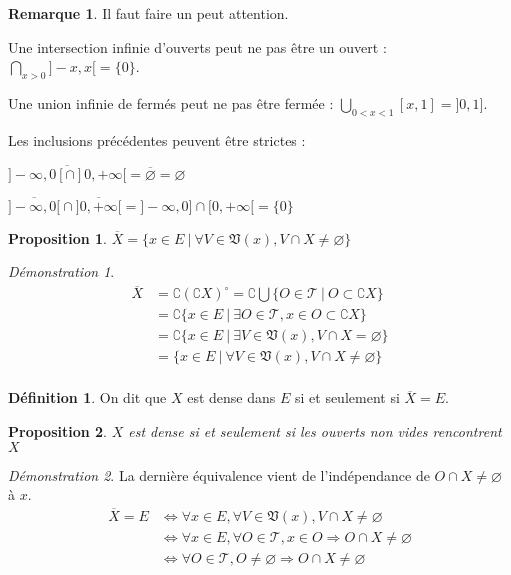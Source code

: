 \documentclass[a4paper, 11pt, french]{book}
\newenvironment{itemise}{\itemize}{\enditemize}
\theoremstyle{plain} %
\newtheorem{proposition}{Proposition}
\theoremstyle{definition} %
\newtheorem{definition}{Définition}
\newtheorem{remarque}{Remarque}
\theoremstyle{remark} %
\newtheorem*{demonstration}{Démonstration}
\newcommand{\1}{\mathds{1}}
\newcommand\vide{\varnothing}
\renewcommand{\frak}[1]{\mathfrak{#1}}
\newcommand{\scr}[1]{\mathscr{#1}}
\newcommand\ens[2]{\{#1 \ |\ #2\}}
\begin{document}
\begin{remarque}
	Il faut faire un peut attention.
	\begin{itemise}
		\item Une intersection infinie d'ouverts peut ne pas être un ouvert : $\bigcap_{x>0}]-x,x[=\{0\}$.
		\item Une union infinie de fermés peut ne pas être fermée : $\bigcup_{0<x<1}[x,1]=]0, 1]$.
		\item Les inclusions précédentes peuvent être strictes :
		\begin{itemise}
			\item $\overline{]-\infty, 0[\cap]0, +\infty[}=\overline{\vide}=\vide$
			\item $\overline{]-\infty, 0[}\cap\overline{]0, +\infty[}=]-\infty, 0]\cap[0, +\infty[=\{0\}$
		\end{itemise}
	\end{itemise}
\end{remarque}

\begin{proposition}
	$\overline{X}=\ens{x\in E}{\forall V\in\frak{V}(x), V\cap X\neq\vide}$
\end{proposition}

\begin{demonstration}
	\begin{align*}
		\overline{X}
		&=\complement(\complement X)^\circ
		=\complement\bigcup\ens{O\in\scr{T}}{O\subset\complement X} \\
		&=\complement\ens{x\in E}{\exists O\in\scr{T}, x\in O\subset\complement X} \\
		&=\complement\ens{x\in E}{\exists V\in\frak{V}(x), V\cap X=\vide} \\
		&=\ens{x\in E}{\forall V\in\frak{V}(x), V\cap X\neq\vide} \\
	\end{align*}
\end{demonstration}

\begin{definition}
	On dit que $X$ est dense dans $E$ si et seulement si $\overline{X}=E$.
\end{definition}

\begin{proposition}
	$X$ est dense si et seulement si les ouverts non vides rencontrent $X$
\end{proposition}

\begin{demonstration}
	La dernière équivalence vient de l'indépendance de $O\cap X\neq\vide$ à $x$.
	\begin{align*}
		\overline{X}=E
		&\iff\forall x\in E, \forall V\in\frak{V}(x), V\cap X\neq\vide \\
		&\iff\forall x\in E, \forall O\in\scr{T}, x\in O\Rightarrow O\cap X\neq\vide \\
		&\iff\forall O\in\scr{T}, O\neq\vide\Rightarrow O\cap X\neq\vide
	\end{align*}
\end{demonstration}
\end{document}
